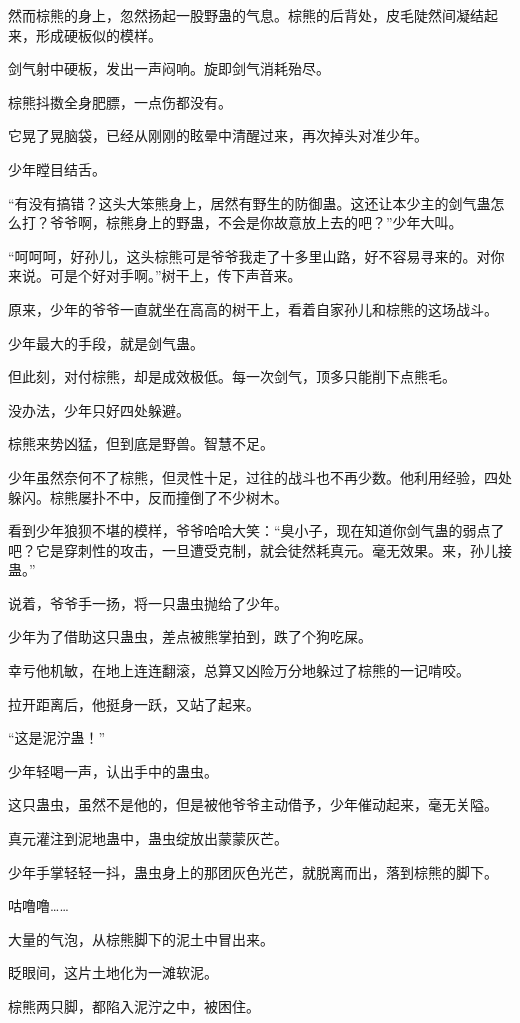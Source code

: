 \begin{this_body}
然而棕熊的身上，忽然扬起一股野蛊的气息。棕熊的后背处，皮毛陡然间凝结起来，形成硬板似的模样。

剑气射中硬板，发出一声闷响。旋即剑气消耗殆尽。

棕熊抖擞全身肥膘，一点伤都没有。

它晃了晃脑袋，已经从刚刚的眩晕中清醒过来，再次掉头对准少年。

少年瞠目结舌。

“有没有搞错？这头大笨熊身上，居然有野生的防御蛊。这还让本少主的剑气蛊怎么打？爷爷啊，棕熊身上的野蛊，不会是你故意放上去的吧？”少年大叫。

“呵呵呵，好孙儿，这头棕熊可是爷爷我走了十多里山路，好不容易寻来的。对你来说。可是个好对手啊。”树干上，传下声音来。

原来，少年的爷爷一直就坐在高高的树干上，看着自家孙儿和棕熊的这场战斗。

少年最大的手段，就是剑气蛊。

但此刻，对付棕熊，却是成效极低。每一次剑气，顶多只能削下点熊毛。

没办法，少年只好四处躲避。

棕熊来势凶猛，但到底是野兽。智慧不足。

少年虽然奈何不了棕熊，但灵性十足，过往的战斗也不再少数。他利用经验，四处躲闪。棕熊屡扑不中，反而撞倒了不少树木。

看到少年狼狈不堪的模样，爷爷哈哈大笑：“臭小子，现在知道你剑气蛊的弱点了吧？它是穿刺性的攻击，一旦遭受克制，就会徒然耗真元。毫无效果。来，孙儿接蛊。”

说着，爷爷手一扬，将一只蛊虫抛给了少年。

少年为了借助这只蛊虫，差点被熊掌拍到，跌了个狗吃屎。

幸亏他机敏，在地上连连翻滚，总算又凶险万分地躲过了棕熊的一记啃咬。

拉开距离后，他挺身一跃，又站了起来。

“这是泥泞蛊！”

少年轻喝一声，认出手中的蛊虫。

这只蛊虫，虽然不是他的，但是被他爷爷主动借予，少年催动起来，毫无关隘。

真元灌注到泥地蛊中，蛊虫绽放出蒙蒙灰芒。

少年手掌轻轻一抖，蛊虫身上的那团灰色光芒，就脱离而出，落到棕熊的脚下。

咕噜噜……

大量的气泡，从棕熊脚下的泥土中冒出来。

眨眼间，这片土地化为一滩软泥。

棕熊两只脚，都陷入泥泞之中，被困住。


\end{this_body}
